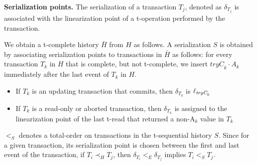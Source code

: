 \vspace{1mm}\noindent\textbf{Serialization points.}
The serialization of a transaction $T_j$, denoted as $\delta_{T_j}$ is
associated with the linearization point of a t-operation 
performed by the transaction.

We obtain a t-complete history ${\bar H}$ from $H$ as follows. 
A serialization $S$ is obtained by associating serialization points to transactions in ${\bar H}$ as follows:
for every transaction $T_k$ in $H$ that is complete, but not t-complete, 
we insert $\textit{tryC}_k\cdot A_k$ immediately 
after the last event of $T_k$ in $H$. 
%
\begin{itemize}
\item If $T_k$ is an updating transaction that commits, then $\delta_{T_k}$ is $\ell_{\textit{tryC}_k}$
\item If $T_k$ is a read-only or aborted transaction,
then $\delta_{T_k}$ is assigned to the linearization point of the last t-read that returned a non-A$_k$ value in $T_k$
\end{itemize}
%
$<_S$ denotes a total-order on transactions in the t-sequential history $S$.
Since for a given transaction, its
serialization point is chosen between the first and last event of the transaction,
if $T_i \prec_{H} T_j$, then $\delta_{T_i} <_{E} \delta_{T_j}$ implies $T_i <_S T_j$.

